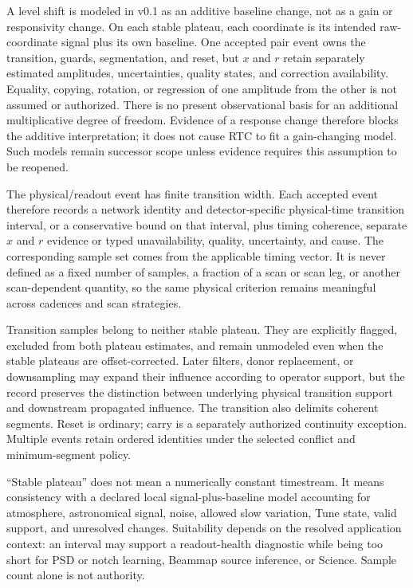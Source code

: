 \documentclass[10pt]{article}
\begin{document}
A level shift is modeled in v0.1 as an additive baseline change, not as a gain
or responsivity change. On each stable plateau, each coordinate is its
intended raw-coordinate signal plus its own baseline.  One accepted pair event
owns the transition, guards, segmentation, and reset, but $x$ and $r$ retain
separately estimated amplitudes, uncertainties, quality states, and correction
availability.  Equality, copying, rotation, or regression of one amplitude
from the other is not assumed or authorized. There is no present observational basis for an
additional multiplicative degree of freedom. Evidence of a response change
therefore blocks the additive interpretation; it does not cause RTC to fit a
gain-changing model. Such models remain successor scope unless evidence
requires this assumption to be reopened.

The physical/readout event has finite transition width. Each accepted event
therefore records a network identity and detector-specific physical-time
transition interval, or a conservative bound on that interval, plus timing
coherence, separate $x$ and $r$ evidence or typed unavailability, quality,
uncertainty, and cause. The corresponding sample set comes from the applicable
timing vector. It is never defined as a fixed number of samples, a fraction of
a scan or scan leg, or another scan-dependent quantity, so the same physical
criterion remains meaningful across cadences and scan strategies.

Transition samples belong to neither stable plateau. They are explicitly
flagged, excluded from both plateau estimates, and remain unmodeled even when
the stable plateaus are offset-corrected. Later filters, donor replacement, or
downsampling may expand their influence according to operator support, but the
record preserves the distinction between underlying physical transition
support and downstream propagated influence. The transition also delimits
coherent segments. Reset is ordinary; carry is a separately authorized
continuity exception. Multiple events retain ordered identities under the
selected conflict and minimum-segment policy.

``Stable plateau'' does not mean a numerically constant timestream.  It means
consistency with a declared local signal-plus-baseline model accounting for
atmosphere, astronomical signal, noise, allowed slow variation, Tune state,
valid support, and unresolved changes. Suitability depends on the resolved
application context: an interval may support a readout-health diagnostic while
being too short for PSD or notch learning, Beammap source inference, or
Science. Sample count alone is not authority.
\end{document}
